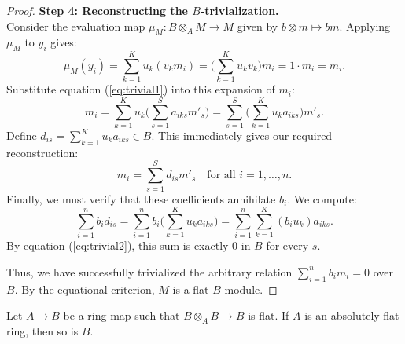 \begin{proof}
    \medskip\noindent
    \textbf{Step 4: Reconstructing the $B$-trivialization.} \\
    Consider the evaluation map $\mu_M: B \otimes_A M \to M$ given by $b \otimes m \mapsto bm$. Applying $\mu_M$ to $y_i$ gives:
    \[
    \mu_M(y_i) = \sum_{k=1}^K u_k (v_k m_i) = \Big(\sum_{k=1}^K u_k v_k\Big) m_i = 1 \cdot m_i = m_i.
    \]
    Substitute equation (\ref{eq:trivial1}) into this expansion of $m_i$:
    \[
    m_i = \sum_{k=1}^K u_k \Big( \sum_{s=1}^S a_{iks} m'_s \Big) = \sum_{s=1}^S \Big( \sum_{k=1}^K u_k a_{iks} \Big) m'_s.
    \]
    Define $d_{is} = \sum_{k=1}^K u_k a_{iks} \in B$. This immediately gives our required reconstruction:
    \[
    m_i = \sum_{s=1}^S d_{is} m'_s \quad \text{for all } i = 1, \dots, n.
    \]
    Finally, we must verify that these coefficients annihilate $b_i$. We compute:
    \[
    \sum_{i=1}^n b_i d_{is} = \sum_{i=1}^n b_i \Big( \sum_{k=1}^K u_k a_{iks} \Big) = \sum_{i=1}^n \sum_{k=1}^K (b_i u_k) a_{iks}.
    \]
    By equation (\ref{eq:trivial2}), this sum is exactly $0$ in $B$ for every $s$. 

    Thus, we have successfully trivialized the arbitrary relation $\sum_{i=1}^n b_i m_i = 0$ over $B$. By the equational criterion, $M$ is a flat $B$-module.
    
\end{proof}

\begin{lemma}[\stacksproject{092I} (1)]
    \label{lem:weakly-etale-preserves-absolutely-flat}
    Let $A \to B$ be a ring map such that $B \otimes_{A} B \to B$ is flat. If $A$ is an absolutely
    flat ring, then so is $B$.
    \leanok
\end{lemma}

